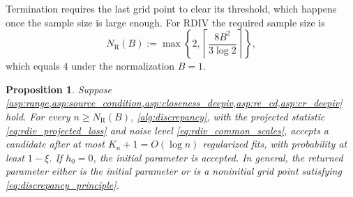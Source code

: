 \documentclass[12pt]{article}
\theoremstyle{plain}
\newtheorem{proposition}[theorem]{Proposition}
\theoremstyle{definition}
\theoremstyle{remark}
\begin{document}
Termination requires the last grid point to clear its threshold, which happens once the sample size is large enough. For RDIV the required sample size is
\[
N_{\mathrm R}(B) :=\max\left\{2, \left\lceil\frac{8B^2}{3\log 2}\right\rceil\right\},
\]
which equals $4$ under the normalization $B=1$.

\begin{proposition}\label{prop:exist_lambda_deepiv}
Suppose \cref{asp:range,asp:source_condition,asp:closeness_deepiv,asp:re_cd,asp:cr_deepiv} hold. For every $n\geqslant N_{\mathrm R}(B)$, \cref{alg:discrepancy}, with the projected statistic \eqref{eq:rdiv_projected_loss} and noise level \eqref{eq:rdiv_common_scales}, accepts a candidate after at most $K_n+1=O(\log n)$ regularized fits, with probability at least $1-\xi$. If $h_0=0$, the initial parameter is accepted. In general, the returned parameter either is the initial parameter or is a noninitial grid point satisfying \eqref{eq:discrepancy_principle}.


\end{proposition}
\end{document}
